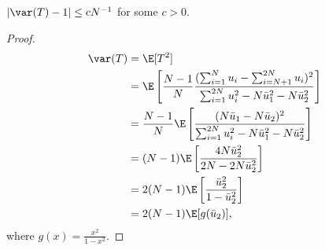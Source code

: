 \begin{proposition}
  $|\var(T)-1| \leq cN^{-1}$ for some $c>0$.
\end{proposition}
\begin{proof}
  \begin{align}
    \var(T) &= \E[T^2] \nonumber \\
    &= \E \left [\frac{N-1}{N} \frac{
        (\sum_{i=1}^N u_i - \sum_{i=N+1}^{2N}u_i)^2}
      {\sum_{i=1}^{2N}u_i^2-N\bar{u}_1^2-N\bar{u}_2^2} \right ] \nonumber \\
    &= \frac{N-1}{N} \E \left [\frac{
        (N\bar{u}_1-N\bar{u}_2)^2}
      {\sum_{i=1}^{2N}u_i^2-N\bar{u}_1^2-N\bar{u}_2^2} \right ] \nonumber \\
    &= (N-1)\E \left [\frac{
        4 N\bar{u}_2^2}{2N-2N\bar{u}_2^2} \right ] \nonumber \\
    &= 2(N-1)\E \left [\frac{
        \bar{u}_2^2}{1-\bar{u}_2^2} \right ] \nonumber \\
    &= 2(N-1) \E[g(\bar{u}_2)], \label{def:varT}
  \end{align}
  where $g(x) = \frac{x^2}{1-x^2}$. 


\end{proof}
